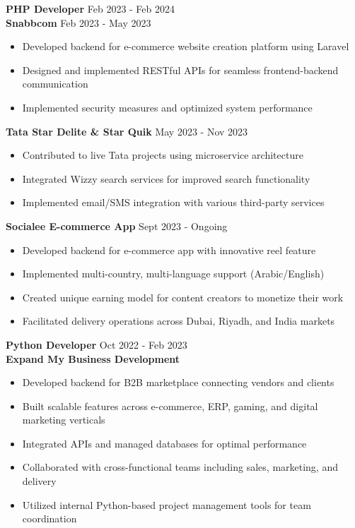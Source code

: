 \documentclass[10pt,a4paper]{article}
\begin{document}
\begin{paracol}{2}
\begin{rightcolumn}
\textbf{\color{darkblue}PHP Developer} \hfill \textcolor{mediumgray}{\small Feb 2023 - Feb 2024}\\[1mm]
\textbf{Snabbcom} \hfill \textcolor{mediumgray}{\footnotesize Feb 2023 - May 2023}
\begin{itemize}[leftmargin=10pt]
    \item Developed backend for e-commerce website creation platform using Laravel
    \item Designed and implemented RESTful APIs for seamless frontend-backend communication
    \item Implemented security measures and optimized system performance
\end{itemize}
\vspace{1.5mm}
\textbf{Tata Star Delite \& Star Quik} \hfill \textcolor{mediumgray}{\footnotesize May 2023 - Nov 2023}
\begin{itemize}[leftmargin=10pt]
    \item Contributed to live Tata projects using microservice architecture
    \item Integrated Wizzy search services for improved search functionality
    \item Implemented email/SMS integration with various third-party services
\end{itemize}
\vspace{1.5mm}
\textbf{Socialee E-commerce App} \hfill \textcolor{mediumgray}{\footnotesize Sept 2023 - Ongoing}
\begin{itemize}[leftmargin=10pt]
    \item Developed backend for e-commerce app with innovative reel feature
    \item Implemented multi-country, multi-language support (Arabic/English)
    \item Created unique earning model for content creators to monetize their work
    \item Facilitated delivery operations across Dubai, Riyadh, and India markets
\end{itemize}

\vspace{2mm}
\textbf{\color{darkblue}Python Developer} \hfill \textcolor{mediumgray}{\small Oct 2022 - Feb 2023}\\[1mm]
\textbf{Expand My Business Development}
\begin{itemize}[leftmargin=10pt]
    \item Developed backend for B2B marketplace connecting vendors and clients
    \item Built scalable features across e-commerce, ERP, gaming, and digital marketing verticals
    \item Integrated APIs and managed databases for optimal performance
    \item Collaborated with cross-functional teams including sales, marketing, and delivery
    \item Utilized internal Python-based project management tools for team coordination
\end{itemize}


\end{rightcolumn}
\end{paracol}
\end{document}
